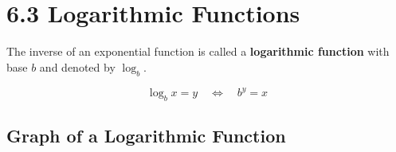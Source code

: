 %
%

\section*{6.3 Logarithmic Functions}

The inverse of an exponential function is called a \textbf{logarithmic function} with base \(b\) and denoted by \( \log_b \).

\[ \log_b{x} = y \quad \Leftrightarrow \quad b^y = x \]

\subsection*{Graph of a Logarithmic Function}

\begin{center}
\end{center}
